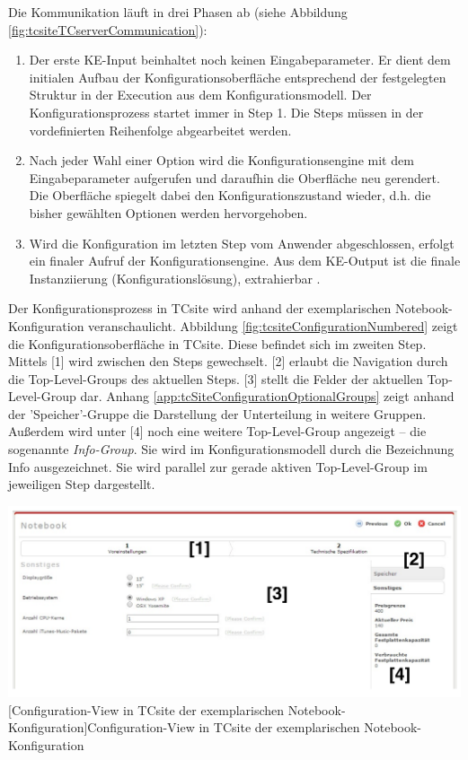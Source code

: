 \documentclass[11pt, a4paper, titlepage, listof=totoc, bibliography=totoc, index=totoc, twoside, openright, headings=normal, draft]{scrreprt}
\begin{document}
Die Kommunikation läuft in drei Phasen ab (siehe Abbildung \ref{fig:tcsiteTCserverCommunication}):
\begin{enumerate}
\item[\textbf{initiate configuration}:]Der erste KE-Input beinhaltet noch keinen Eingabeparameter. Er dient dem initialen Aufbau der Konfigurationsoberfläche entsprechend der festgelegten Struktur in der Execution aus dem Konfigurationsmodell. Der Konfigurationsprozess startet immer in Step 1. Die Steps müssen in der vordefinierten Reihenfolge abgearbeitet werden.
\item[\textbf{loop}:] Nach jeder Wahl einer Option wird die Konfigurationsengine mit dem Eingabeparameter aufgerufen und daraufhin die Oberfläche neu gerendert. Die Oberfläche spiegelt dabei den Konfigurationszustand wieder, d.h. die bisher gewählten Optionen werden hervorgehoben.
\item[\textbf{finish configuration}:] Wird die Konfiguration im letzten Step vom Anwender abgeschlossen, erfolgt ein finaler Aufruf der Konfigurationsengine. Aus dem KE-Output ist die finale Instanziierung (Konfigurationslösung), extrahierbar \citep{tactonTCsiteDevelopmentManual}.
\end{enumerate}

Der Konfigurationsprozess in TCsite wird anhand der exemplarischen Notebook-Konfiguration veranschaulicht. Abbildung \ref{fig:tcsiteConfigurationNumbered} zeigt die Konfigurationsoberfläche in TCsite. Diese befindet sich im zweiten Step. Mittels [1] wird zwischen den Steps gewechselt. [2] erlaubt die Navigation durch die Top-Level-Groups des aktuellen Steps. [3] stellt die Felder der aktuellen Top-Level-Group dar. Anhang \ref{app:tcSiteConfigurationOptionalGroups} zeigt anhand der 'Speicher'-Gruppe die Darstellung der Unterteilung in weitere Gruppen. Außerdem wird unter [4] noch eine weitere Top-Level-Group angezeigt -- die sogenannte \emph{Info-Group}. Sie wird im Konfigurationsmodell durch die Bezeichnung \glqq Info\grqq{} ausgezeichnet. Sie wird parallel zur gerade aktiven Top-Level-Group im jeweiligen Step dargestellt.

\vspace{1em}
\begin{minipage}{\linewidth}
	\centering
	\includegraphics[width=1\linewidth]{Abbildungen/tcsiteConfigurationNumbered.pdf}
	[Configuration-View in TCsite der exemplarischen Notebook-Konfiguration]{Configuration-View in TCsite der exemplarischen Notebook-Konfiguration}
	\label{fig:tcsiteConfigurationNumbered}
\end{minipage}
\vspace{0.3em}
\end{document}
